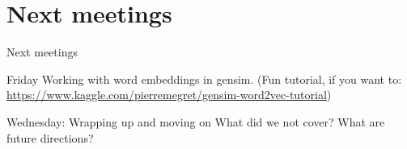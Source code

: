\documentclass{beamer}
\begin{document}
\section{Next meetings}
\begin{frame}{Next meetings}

\begin{block}{Friday}
Working with word embeddings in gensim.
(Fun tutorial, if you want to: \url{https://www.kaggle.com/pierremegret/gensim-word2vec-tutorial})
\end{block}

\begin{block}{Wednesday: Wrapping up and moving on}
What did we not cover? What are future directions?
\end{block}


\end{frame}
\end{document}
